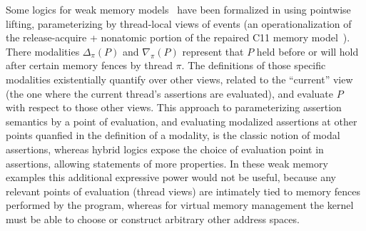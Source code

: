 
Some logics for weak memory models~\cite{dang2019rustbelt,dang2022compass} have been formalized
in \iris using pointwise lifting, parameterizing by thread-local views of events (an operationalization of the release-acquire + nonatomic
portion of the repaired C11 memory model~\cite{lahav2017repairing}). 
There modalities $\Delta_\pi(P)$ and $\nabla_\pi(P)$
represent that $P$ held before or will hold after certain memory fences by thread $\pi$.
The definitions of those specific modalities existentially quantify over other views, related to the ``current'' view (the one where
the current thread's assertions are evaluated), and evaluate $P$ with respect to those other views. This approach to parameterizing
assertion semantics by a point of evaluation, and evaluating modalized assertions at other points quanfied in the definition of a modality,
is the classic notion of modal assertions, 
whereas hybrid logics expose the choice of evaluation point in assertions,
allowing statements of more properties. 
In these weak memory examples this additional expressive power would not be useful,
because any relevant points of evaluation (thread views) are intimately tied to memory fences performed by the program, whereas
for virtual memory management the kernel must be able to choose or construct arbitrary other address spaces.

